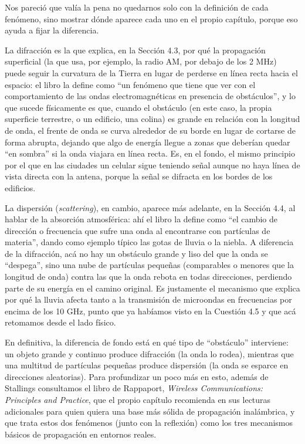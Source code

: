 \documentclass[11pt,a4paper]{article}
\begin{document}
\begin{enumerate}[label=4.\arabic*), itemsep=0.3cm]
        Nos pareció que valía la pena no quedarnos solo con la definición de cada fenómeno, sino mostrar dónde aparece cada uno en el propio capítulo, porque eso ayuda a fijar la diferencia.

        La difracción es la que explica, en la Sección 4.3, por qué la propagación superficial (la que usa, por ejemplo, la radio AM, por debajo de los 2 MHz) puede seguir la curvatura de la Tierra en lugar de perderse en línea recta hacia el espacio: el libro la define como ``un fenómeno que tiene que ver con el comportamiento de las ondas electromagnéticas en presencia de obstáculos'', y lo que sucede físicamente es que, cuando el obstáculo (en este caso, la propia superficie terrestre, o un edificio, una colina) es grande en relación con la longitud de onda, el frente de onda se curva alrededor de su borde en lugar de cortarse de forma abrupta, dejando que algo de energía llegue a zonas que deberían quedar ``en sombra'' si la onda viajara en línea recta. Es, en el fondo, el mismo principio por el que en las ciudades un celular sigue teniendo señal aunque no haya línea de vista directa con la antena, porque la señal se difracta en los bordes de los edificios.

        La dispersión (\textit{scattering}), en cambio, aparece más adelante, en la Sección 4.4, al hablar de la absorción atmosférica: ahí el libro la define como ``el cambio de dirección o frecuencia que sufre una onda al encontrarse con partículas de materia'', dando como ejemplo típico las gotas de lluvia o la niebla. A diferencia de la difracción, acá no hay un obstáculo grande y liso del que la onda se ``despega'', sino una nube de partículas pequeñas (comparables o menores que la longitud de onda) contra las que la onda rebota en todas direcciones, perdiendo parte de su energía en el camino original. Es justamente el mecanismo que explica por qué la lluvia afecta tanto a la transmisión de microondas en frecuencias por encima de los 10 GHz, punto que ya habíamos visto en la Cuestión 4.5 y que acá retomamos desde el lado físico.

        En definitiva, la diferencia de fondo está en qué tipo de ``obstáculo'' interviene: un objeto grande y continuo produce difracción (la onda lo rodea), mientras que una multitud de partículas pequeñas produce dispersión (la onda se esparce en direcciones aleatorias). Para profundizar un poco más en esto, además de Stallings consultamos el libro de Rappaport, \textit{Wireless Communications: Principles and Practice}, que el propio capítulo recomienda en sus lecturas adicionales para quien quiera una base más sólida de propagación inalámbrica, y que trata estos dos fenómenos (junto con la reflexión) como los tres mecanismos básicos de propagación en entornos reales.
\end{enumerate}
\end{document}
